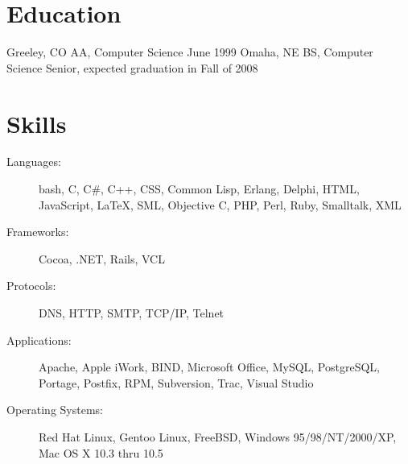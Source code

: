 \documentclass{resume}
\begin{document}
\section{Education}
\begin{itemize}
             {Greeley, CO}
             {AA, Computer Science}
             {June 1999}
             {Omaha, NE}
             {BS, Computer Science}
             {Senior, expected graduation in Fall of 2008}
\end{itemize}

\section{Skills}
\begin{description}
\item[Languages:] bash, C, C\#, C++, CSS, Common Lisp, Erlang, Delphi, HTML,
  JavaScript, \LaTeX, SML, Objective C, PHP, Perl, Ruby, Smalltalk, XML
\item[Frameworks:] Cocoa, .NET, Rails, VCL
\item[Protocols:] DNS, HTTP, SMTP, TCP/IP, Telnet
\item[Applications:] Apache, Apple iWork, BIND, Microsoft Office, MySQL,
  PostgreSQL, Portage, Postfix, RPM, Subversion, Trac, Visual Studio
\item[Operating Systems:] Red Hat Linux, Gentoo Linux, FreeBSD, Windows
  95/98/NT/2000/XP, Mac OS X 10.3 thru 10.5
\end{description}
\end{document}
